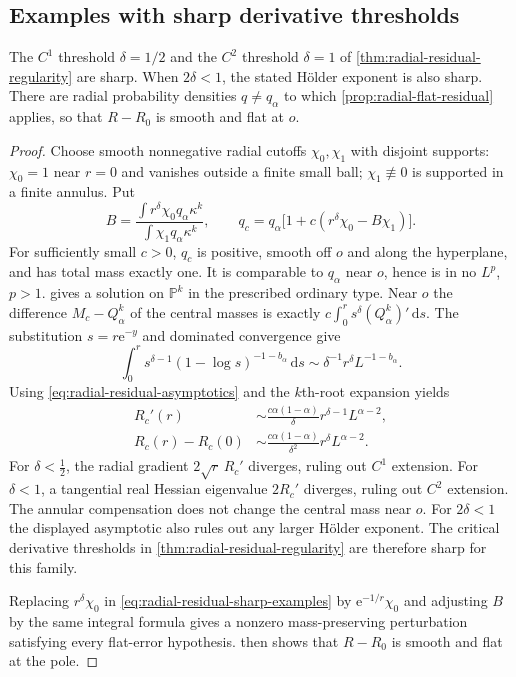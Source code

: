 \subsection{Examples with sharp derivative thresholds}
\begin{proposition}\label{prop:radial-residual-sharpness}
The $C^1$ threshold $\delta=1/2$ and the $C^2$ threshold $\delta=1$ of \cref{thm:radial-residual-regularity} are sharp. When $2\delta<1$, the stated H\"older exponent is also sharp. There are radial probability densities $q\ne q_\alpha$ to which \cref{prop:radial-flat-residual} applies, so that $R-R_0$ is smooth and flat at $o$.
\end{proposition}
\begin{proof}
Choose smooth nonnegative radial cutoffs $\chi_0,\chi_1$ with
disjoint supports: $\chi_0=1$ near $r=0$ and vanishes outside a
finite small ball; $\chi_1\not\equiv0$ is supported in a finite annulus. Put
\begin{equation}\label{eq:radial-residual-sharp-examples}
 B=\frac{\int r^\delta\chi_0q_\alpha\kappa^k}
          {\int\chi_1q_\alpha\kappa^k},\qquad
 q_c=q_\alpha\bigl[1+c(r^\delta\chi_0-B\chi_1)\bigr].
\end{equation}
For sufficiently small $c>0$, $q_c$ is positive, smooth off $o$
and along the hyperplane, and has total mass exactly one. It is
comparable to $q_\alpha$ near $o$, hence is in no $L^p$, $p>1$.
 gives a solution on $\mathbb P^k$ in
the prescribed ordinary type. Near $o$ the difference $M_c-Q_\alpha^k$ of the central masses is
exactly $c\int_0^r s^\delta(Q_\alpha^k)'\,\mathrm{d}s$.
The substitution $s=r\mathrm{e}^{-y}$ and dominated convergence give
\[
 \int_0^r s^{\delta-1}(1-\log s)^{-1-b_\alpha}\,\mathrm{d}s
 \sim\delta^{-1}r^\delta L^{-1-b_\alpha}.
\]
Using \eqref{eq:radial-residual-asymptotics} and the $k$th-root expansion yields
\begin{align*}
 R_c'(r)&\sim\frac{c\alpha(1-\alpha)}\delta
                  r^{\delta-1}L^{\alpha-2},\\
 R_c(r)-R_c(0)&\sim\frac{c\alpha(1-\alpha)}{\delta^2}
                  r^\delta L^{\alpha-2}.
\end{align*}
For $\delta<\frac12$, the radial gradient
$2\sqrt r\,R_c'$ diverges, ruling out $C^1$ extension. For
$\delta<1$, a tangential real Hessian eigenvalue $2R_c'$ diverges,
ruling out $C^2$ extension. The annular compensation does not change the
central mass near $o$. For $2\delta<1$ the displayed asymptotic also rules
out any larger H\"older exponent. The critical derivative thresholds
in \cref{thm:radial-residual-regularity} are therefore sharp for this family.

Replacing $r^\delta\chi_0$ in \eqref{eq:radial-residual-sharp-examples} by
$\mathrm{e}^{-1/r}\chi_0$ and adjusting $B$ by the same integral formula
gives a nonzero mass-preserving perturbation satisfying every
flat-error hypothesis.  then shows that
$R-R_0$ is smooth and flat at the pole.
\end{proof}

